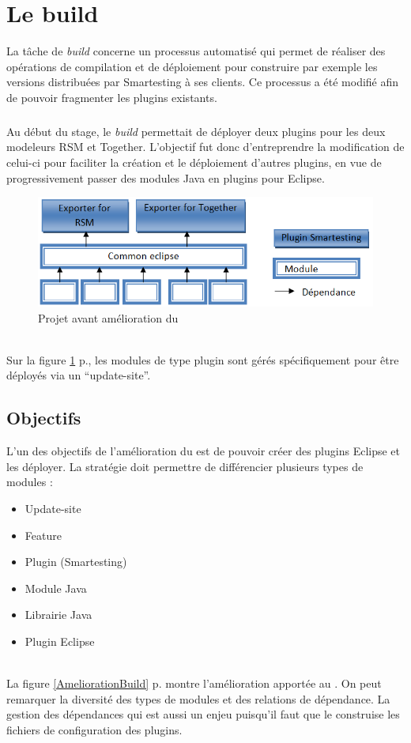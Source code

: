 \section{Le build}\label{section_build}

La tâche de \textit{build} concerne un processus automatisé qui permet de réaliser des opérations de compilation et de déploiement pour construire par exemple les versions distribuées par Smartesting à ses clients.
Ce processus a été modifié afin de pouvoir fragmenter les plugins existants.

\subparagraph*{}
Au début du stage, le \textit{build} permettait de déployer deux plugins pour les deux modeleurs RSM et Together.
L'objectif fut donc d'entreprendre la modification de celui-ci pour faciliter la création et le déploiement d'autres plugins, en vue de progressivement passer des modules Java en plugins pour Eclipse.

\begin{figure}[!h]
\begin{center}
  \includegraphics[scale=.6]{images/AvantBuild.png}
  \caption{Projet avant amélioration du \build}
  \label{AvantAmeliorationBuild}
\end{center}
\end{figure}
\ \\
Sur la figure \ref{AvantAmeliorationBuild} p.\pageref{AvantAmeliorationBuild}, les modules de type plugin sont gérés spécifiquement pour être déployés via un ``update-site''.

\subsection{Objectifs}

L'un des objectifs de l'amélioration du \build est de pouvoir créer des plugins Eclipse et les déployer.
La stratégie doit permettre de différencier plusieurs types de modules :
\begin{itemize}
  \item Update-site
  \item Feature
  \item Plugin (Smartesting)
  \item Module Java
  \item Librairie Java
  \item Plugin Eclipse
\end{itemize}
\ \\
La figure \ref{AmeliorationBuild} p.\pageref{AmeliorationBuild} montre l'amélioration apportée au \build. 
On peut remarquer la diversité des types de modules et des relations de dépendance.
La gestion des dépendances qui est aussi un enjeu puisqu'il faut que le \build construise les fichiers de configuration des plugins.

